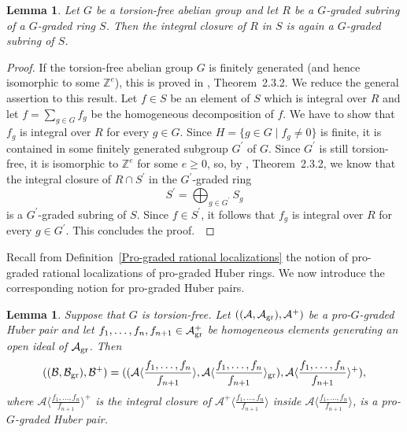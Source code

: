\documentclass[12pt,twoside,a4paper]{article}
\newtheorem{lemma}[thm]{Lemma}
\theoremstyle{definition}
\theoremstyle{remark}
\newcommand\gr{{\rm gr}}
\begin{document}
\begin{lemma}\label{Integral closure and grading}Let $G$ be a torsion-free abelian group and let $R$ be a $G$-graded subring of a $G$-graded ring $S$. Then the integral closure of $R$ in $S$ is again a $G$-graded subring of $S$.\end{lemma}
\begin{proof}If the torsion-free abelian group $G$ is finitely generated (and hence isomorphic to some $\mathbb{Z}^{e}$), this is proved in \cite{Swanson-Huneke}, Theorem~2.3.2. We reduce the general assertion to this result. Let $f\in S$ be an element of $S$ which is integral over $R$ and let $f=\sum_{g\in G}f_{g}$ be the homogeneous decomposition of $f$. We have to show that $f_{g}$ is integral over $R$ for every $g\in G$. Since $H=\{g\in G\mid f_{g}\neq 0\}$ is finite, it is contained in some finitely generated subgroup $G^{\prime}$ of $G$. Since $G^{\prime}$ is still torsion-free, it is isomorphic to $\mathbb{Z}^{e}$ for some $e\geq0$, so, by \cite{Swanson-Huneke}, Theorem~2.3.2, we know that the integral closure of $R\cap S^{\prime}$ in the $G^{\prime}$-graded ring \begin{equation*}S^{\prime}=\bigoplus_{g\in G^{\prime}}S_{g}\end{equation*}is a $G^{\prime}$-graded subring of $S$. Since $f\in S^{\prime}$, it follows that $f_{g}$ is integral over $R$ for every $g\in G^{\prime}$. This concludes the proof. \end{proof}
Recall from Definition~\ref{Pro-graded rational localizations} the notion of pro-graded rational localizations of pro-graded Huber rings. We now introduce the corresponding notion for pro-graded Huber pairs.
\begin{lemma}\label{Pro-graded rational localizations for Huber pairs}Suppose that $G$ is torsion-free. Let $((\mathcal{A}, \mathcal{A}_{\gr}), \mathcal{A}^{+})$ be a pro-$G$-graded Huber pair and let $f_1,\dots, f_{n}, f_{n+1}\in \mathcal{A}_{\gr}^{+}$ be homogeneous elements generating an open ideal of $\mathcal{A}_{\gr}$. Then \begin{equation*}((\mathcal{B}, \mathcal{B}_{\gr}), \mathcal{B}^{+})=((\mathcal{A}\langle \frac{f_1,\dots, f_n}{f_{n+1}}\rangle, \mathcal{A}\langle \frac{f_1,\dots, f_n}{f_{n+1}}\rangle_{\gr}), \mathcal{A}\langle \frac{f_1,\dots, f_n}{f_{n+1}}\rangle^{+}),\end{equation*}where $\mathcal{A}\langle \frac{f_1,\dots, f_n}{f_{n+1}}\rangle^{+}$ is the integral closure of $\mathcal{A}^{+}\langle \frac{f_1,\dots, f_n}{f_{n+1}}\rangle$ inside $\mathcal{A}\langle \frac{f_1,\dots, f_n}{f_{n+1}}\rangle$, is a pro-$G$-graded Huber pair. \end{lemma}
\end{document}
